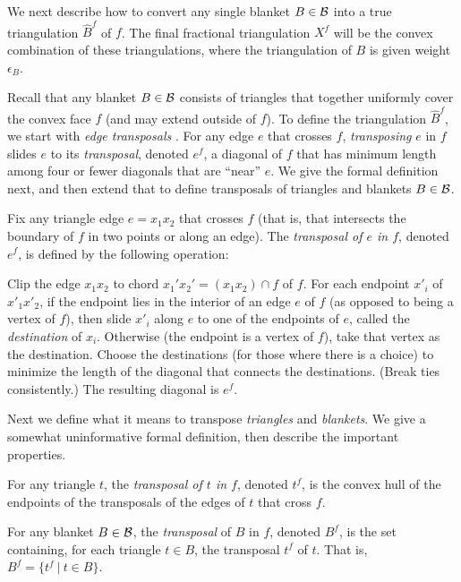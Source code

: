 \documentclass[final]{siamltex}
\newcommand{\transposal}[2]{{#1}^{#2}}
\newcommand{\triangulated}[2]{{\widehat{#1}}^{#2}}
\newcommand{\blanket}{B} \newcommand{\blanketSet}{{\cal B}} \newcommand{\convPart}{\text{\sc cp}}
\newcommand{\edge}{e}
\newcommand{\face}{f}
\newcommand{\tri}{t}  \newcommand{\vertex}{v}
\newcommand{\fracTriang}{X}
\begin{document}
We next describe how to convert any single blanket $\blanket\in\blanketSet$
into a true triangulation $\triangulated{\blanket}{\face}$ of $\face$.  
The final fractional triangulation
$\transposal{\fracTriang}{\face}$ will be the convex combination of these
triangulations, where the triangulation of $\blanket$ is given weight $\epsilon_\blanket$.

Recall that any blanket $\blanket\in\blanketSet$ consists of triangles
that together uniformly cover the convex face $\face$ (and may extend outside of $\face$).
To define the triangulation $\triangulated{\blanket}{\face}$,
we start with {\em edge transposals} \cite[e.g.~Lemma 4.2]{krznaric1998quasi}.
For any edge $\edge$ that crosses $\face$, 
{\em transposing} $\edge$ in $\face$
slides $\edge$ to its {\em transposal}, denoted $\transposal{\edge}{\face}$,
a diagonal of $\face$ that has minimum length 
among four or fewer diagonals that are ``near'' $\edge$.
We give the formal definition next,
and then extend that to define transposals 
of triangles and blankets $\blanket\in\blanketSet$.
\begin{definition}
  Fix any triangle edge $\edge=x_1x_2$ that crosses $\face$ 
  (that is, that intersects the boundary of $\face$ in two points or along an edge).
  The {\em transposal of $\edge$ in $\face$},
  denoted $\transposal{\edge}{\face}$, is defined
  by the following operation:
\begin{window}
  Clip the edge $x_1x_2$ to chord $x_1'x_2' = (x_1 x_2)\cap \face$ of $\face$.
  For each endpoint $x'_i$ of $x'_1x'_2$,
  if the endpoint lies in the interior of an edge $\edge$ of $\face$ 
  (as opposed to being a vertex of $\face$),
  then slide $x'_i$ along $\edge$ to one of the endpoints of $\edge$,
  called the {\em destination} of $x_i$.
  Otherwise (the endpoint is a vertex of $\face$), take that vertex as the destination.
  Choose the destinations (for those where there is a choice) to minimize the length
  of the diagonal that connects the destinations.  (Break ties consistently.)
  The resulting diagonal is $\transposal{\edge}{\face}$.
\end{window}
\end{definition}

Next we define what it means to transpose {\em triangles} and {\em blankets}.
We give a somewhat uninformative formal definition, 
then describe the important properties.
\begin{definition}
  For any triangle $\tri$,
  the {\em transposal of $\tri$ in $\face$},
  denoted $\transposal{\tri}{\face}$,
  is the convex hull of the endpoints of the transposals 
  of the edges of $\tri$ that cross $\face$.


  For any blanket $\blanket\in\blanketSet$,
  the {\em transposal} of $\blanket$ in $\face$,
  denoted $\transposal{\blanket}{\face}$, 
  is the set containing, for each triangle $\tri\in\blanket$, 
  the transposal $\transposal{\tri}{\face}$ of $\tri$.
  That is, $\transposal{\blanket}{\face} = \{ \transposal{\tri}{\face} ~|~\tri\in\blanket\}$.
\end{definition}
\end{document}
